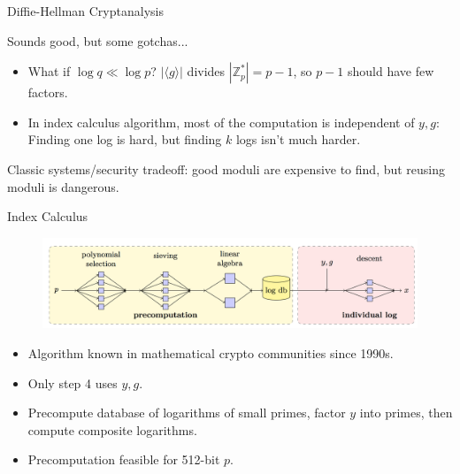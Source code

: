 \documentclass[presentation, aspectratio=54]{beamer}
\begin{document}

\begin{frame}{Diffie-Hellman Cryptanalysis}

Sounds good, but some gotchas...
\begin{itemize}
\item What if $\log q \ll \log p$? $|\langle g \rangle|$ divides
      $|\mathbb{Z}^*_p| = p-1$, so $p-1$ should have few factors.
\item In index calculus algorithm, most of the computation is independent of
      $y,g$: Finding one log is hard, but finding $k$ logs isn't much harder.
\end{itemize}
\pause
\vspace{20pt}
Classic systems/security tradeoff: good moduli are expensive to find, but
reusing moduli is dangerous.

\end{frame}


\begin{frame}{Index Calculus}

\begin{figure}
\centering
\includegraphics[width=0.8\columnwidth]{graphics/DLOGalg.png}
\end{figure}

\begin{itemize}
\item Algorithm known in mathematical crypto communities since 1990s.
\item Only step 4 uses $y,g$.
\item Precompute database of logarithms of small primes, factor $y$ into
      primes, then compute composite logarithms.
\item Precomputation feasible for 512-bit $p$.
\end{itemize}

\end{frame}

\end{document}
